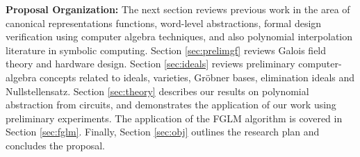 {\bf Proposal Organization:} The next section reviews previous work in
the area of canonical representations functions, word-level
abstractions, formal design verification using computer algebra
techniques, and also polynomial interpolation literature in symbolic
computing. Section \ref{sec:prelimgf} reviews 
Galois field theory and hardware design. Section \ref{sec:ideals}
reviews preliminary computer-algebra concepts related to ideals,
varieties, Gr\"obner bases, elimination ideals and
Nullstellensatz. Section \ref{sec:theory} describes our results on
polynomial abstraction from circuits, and demonstrates the application
of our work using preliminary experiments. The application of the FGLM
algorithm is covered in Section \ref{sec:fglm}. Finally, Section
\ref{sec:obj} outlines the research plan and concludes the proposal. 
